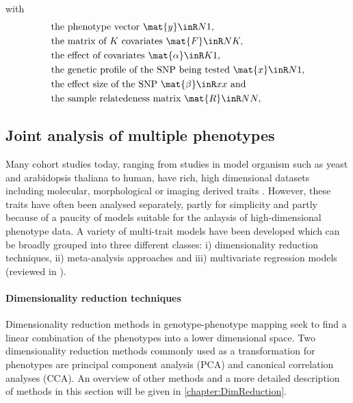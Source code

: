 with
\begin{align*} 
& \text{the phenotype vector }\mat{y} \inR N 1,\\
& \text{the matrix of $K$ covariates }\mat{F} \inR N K,\\
& \text{the effect of covariates } \mat{\alpha} \inR K 1,\\
& \text{the genetic profile of the SNP being tested }\mat{x} \inR N 1,\\
& \text{the effect size of the SNP } \mat{\beta} \inR x x \text{ and}\\
& \text{the sample relatedeness matrix }\mat{R} \inR N N,
\end{align*} 


\subsection{Joint analysis of multiple phenotypes}
Many cohort studies today, ranging from studies in model organism such as yeast and arabidopsis thaliana to human, have rich, high dimensional datasets including molecular, morphological or imaging derived traits \citep{Bloom2013,Atwell2010,Astle2009,Shaffer2016,Stein2010}. However, these traits have often been analysed separately,  partly for simplicity and partly because of a paucity of models suitable for the anlaysis of high-dimensional phenotype data. A variety of multi-trait models have been developed which can be broadly grouped into three different classes: i) dimensionality reduction techniques, ii) meta-analysis approaches and iii) multivariate regression models (reviewed in \citep{Shriner2012,Yang2012}). 

\paragraph{Dimensionality reduction techniques} Dimensionality reduction methods in genotype-phenotype mapping seek to find a linear combination of the phenotypes into a lower dimensional space. Two dimensionality reduction methods commonly used as a transformation for phenotypes are principal component analysis (PCA) and canonical correlation analyses (CCA). An overview of other methods and a more detailed description of methods in this section will be given in \cref{chapter:DimReduction}. 

